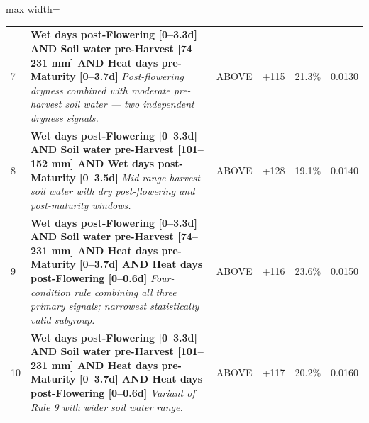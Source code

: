 \begin{table}[htbp]
\begin{adjustbox}{max width=\textwidth}
\begin{tabularx}{\textwidth}{p{0.4cm}|X|>{\centering\arraybackslash}p{0.9cm}|p{1.3cm}|p{1.2cm}|p{1.2cm}}
  7 & \textbf{Wet days post-Flowering [0--3.3d] AND Soil water pre-Harvest [74--231 mm] AND Heat days pre-Maturity [0--3.7d]} \newline \textit{Post-flowering dryness combined with moderate pre-harvest soil water — two independent dryness signals.} & {\footnotesize ABOVE} & +115 & 21.3\% & 0.0130 \\
  8 & \textbf{Wet days post-Flowering [0--3.3d] AND Soil water pre-Harvest [101--152 mm] AND Wet days post-Maturity [0--3.5d]} \newline \textit{Mid-range harvest soil water with dry post-flowering and post-maturity windows.} & {\footnotesize ABOVE} & +128 & 19.1\% & 0.0140 \\
  9 & \textbf{Wet days post-Flowering [0--3.3d] AND Soil water pre-Harvest [74--231 mm] AND Heat days pre-Maturity [0--3.7d] AND Heat days post-Flowering [0--0.6d]} \newline \textit{Four-condition rule combining all three primary signals; narrowest statistically valid subgroup.} & {\footnotesize ABOVE} & +116 & 23.6\% & 0.0150 \\
  10 & \textbf{Wet days post-Flowering [0--3.3d] AND Soil water pre-Harvest [101--231 mm] AND Heat days pre-Maturity [0--3.7d] AND Heat days post-Flowering [0--0.6d]} \newline \textit{Variant of Rule 9 with wider soil water range.} & {\footnotesize ABOVE} & +117 & 20.2\% & 0.0160 \\
  \bottomrule
\end{tabularx}
  \end{adjustbox}
\end{table}

